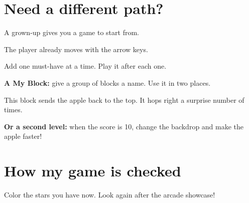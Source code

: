 \documentclass[track=junior,level=2]{kidscode}
\begin{document}
\section{Need a different path?}
\begin{tip}
\begin{minipage}[t]{0.52\linewidth}\RaggedRight
A grown-up gives you a game to start from.\par\smallskip
The player already moves with the arrow keys.\par\smallskip
Add one must-have at a time. Play it after each one.
\end{minipage}\hfill
\begin{minipage}[t]{0.44\linewidth}\vspace{0pt}
\begin{scratch}[scale=0.62]
\end{scratch}
\end{minipage}
\end{tip}

\begin{stretchchallenge}
\begin{minipage}[t]{0.5\linewidth}\RaggedRight
\textbf{A My Block:} give a group of blocks a name. Use it in two places.\par\smallskip
This block sends the apple back to the top. It hops right a surprise number of times.\par\smallskip
\textbf{Or a second level:} when the score is 10, change the backdrop and make the apple faster!
\end{minipage}\hfill
\begin{minipage}[t]{0.46\linewidth}\vspace{0pt}
\begin{scratch}[scale=0.58]
\end{scratch}
\end{minipage}
\end{stretchchallenge}

\section{How my game is checked}
Color the stars you have now. Look again after the arcade showcase!
\end{document}

